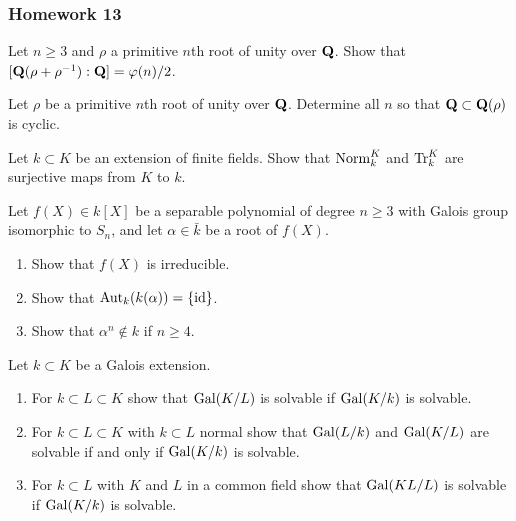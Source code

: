 \subsubsection{Homework 13}
\setcounter{exercise}{0}
\setcounter{equation}{0}

\begin{problem}
Let $n\geq 3$ and $\rho$ a primitive $n$th root of unity over $\mathbf{Q}$. Show
that $[\mathbf{Q}(\rho+\rho^{-1}):\mathbf{Q}]=\varphi(n)/2$.
\end{problem}
\begin{solution}
\end{solution}

\begin{problem}
Let $\rho$ be a primitive $n$th root of unity over $\mathbf{Q}$. Determine all
$n$ so that $\mathbf{Q}\subset\mathbf{Q}(\rho)$ is cyclic.
\end{problem}
\begin{solution}
\end{solution}

\begin{problem}
  Let $k\subset K$ be an extension of finite fields. Show that
  $\operatorname{Norm}_k^K$ and $\operatorname{Tr}_k^K$ are surjective maps from $K$ to
  $k$.
\end{problem}
\begin{solution}
\end{solution}

\begin{problem}
  Let $f(X)\in k[X]$ be a separable polynomial of degree $n\geq 3$ with
  Galois group isomorphic to $S_n$, and let $\alpha\in\bar k$ be a root
  of $f(X)$.
  \begin{enumerate}[label=(\alph*),noitemsep]
  \item Show that $f(X)$ is irreducible.
  \item Show that $\operatorname{Aut}_k(k(\alpha))=\{\operatorname{id}\}$.
  \item Show that $\alpha^n\notin k$ if $n\geq 4$.
  \end{enumerate}
\end{problem}
\begin{solution}
\end{solution}

\begin{problem}
  Let $k\subset K$ be a Galois extension.
\begin{enumerate}[label=(\alph*),noitemsep]
\item For $k\subset L\subset K$ show that $\operatorname{Gal}(K/L)$ is
  solvable if $\operatorname{Gal}(K/k)$ is solvable.
\item For $k\subset L\subset K$ with $k\subset L$ normal show
  that $\operatorname{Gal}(L/k)$ and $\operatorname{Gal}(K/L)$ are solvable if and only if
  $\operatorname{Gal}(K/k)$ is solvable.
\item For $k\subset L$ with $K$ and $L$ in a common field show
  that $\operatorname{Gal}(KL/L)$ is solvable if $\operatorname{Gal}(K/k)$ is solvable.
\end{enumerate}
\end{problem}
\begin{solution}
\end{solution}

